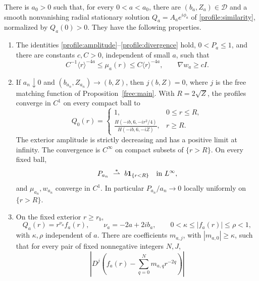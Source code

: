 \begin{proposition}\label{profile:existence}
There is $a_0>0$ such that, for every $0<a<a_0$, there are
$(b_a,Z_a)\in\mathcal D$ and a smooth nonvanishing radial stationary
solution $Q_a=A_ae^{i\phi_a}$ of \eqref{profile:similarity}, normalized by
$Q_a(0)>0$.  They have the following properties.
\begin{enumerate}
\item The identities \eqref{profile:amplitude}--\eqref{profile:divergence}
hold, $0<P_a\le1$, and there are constants $c,C>0$, independent of small
$a$, such that
\begin{equation}\label{profile:coercive-bounds}
 C^{-1}\langle r\rangle^{-4a}\le\mu_a(r)
       \le C\langle r\rangle^{-4a},\qquad
 \nabla w_a\ge c I.
\end{equation}
\item If $a_n\downarrow0$ and $(b_{a_n},Z_{a_n})\to(b,Z)$, then
$j(b,Z)=0$, where $j$ is the free matching function of
Proposition~\ref{free:main}.  With $R=2\sqrt Z$, the profiles converge in
$C^1$ on every compact ball to
\begin{equation}\label{profile:limit}
 Q_0(r)=
 \begin{cases}
 1,&0\le r\le R,\\[2pt]
 \displaystyle\frac{H(-ib,6,-ir^2/4)}{H(-ib,6,-iZ)},&r\ge R.
 \end{cases}
\end{equation}
The exterior amplitude is strictly decreasing and has a positive limit
at infinity.  The convergence is $C^\infty$ on compact subsets of
$\{r>R\}$.  On every fixed ball,
\begin{equation}\label{profile:pressure-limit}
 P_{a_n}\ \stackrel{*}{\rightharpoonup}\ b\mathbf1_{\{r<R\}}
       \quad\hbox{in }L^\infty,
\end{equation}
and $\mu_{a_n},w_{a_n}$ converge in $C^1$.  In particular
$P_{a_n}/a_n\to0$ locally uniformly on $\{r>R\}$.
\item On the fixed exterior $r\ge r_b$,
\begin{equation}\label{profile:tail}
 Q_a(r)=r^{\nu_a}f_a(r),\qquad \nu_a=-2a+2ib_a,
 \qquad 0<\kappa\le|f_a(r)|\le\rho<1,
\end{equation}
with $\kappa,\rho$ independent of $a$.  There are coefficients
$m_{a,j}$, with $|m_{a,0}|\ge\kappa$, such that for every pair of fixed
nonnegative integers $N,J$,
\begin{equation}\label{profile:symbol-expansion}
 \left|D^j\left(f_a(r)-\sum_{q=0}^{N}m_{a,q}r^{-2q}\right)\right|

\end{equation}
\end{enumerate}
\end{proposition}
